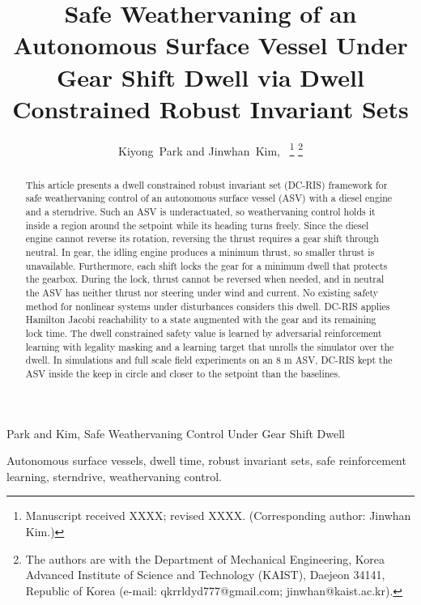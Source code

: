 \documentclass[lettersize,journal]{IEEEtran}
\newcommand{\dcris}{DC-RIS\xspace}
\begin{document}
\title{Safe Weathervaning of an Autonomous Surface Vessel Under Gear Shift Dwell via Dwell Constrained Robust Invariant Sets}

\author{Kiyong~Park and Jinwhan~Kim,~%
\thanks{Manuscript received XXXX; revised XXXX. (Corresponding author: Jinwhan Kim.)}%
\thanks{The authors are with the Department of Mechanical Engineering, Korea Advanced Institute of Science and Technology (KAIST), Daejeon 34141, Republic of Korea (e-mail: qkrrldyd777@gmail.com; jinwhan@kaist.ac.kr).}}

%
{Park and Kim, Safe Weathervaning Control Under Gear Shift Dwell}

\maketitle

\begin{abstract}
This article presents a dwell constrained robust invariant set (DC-RIS) framework for safe weathervaning control of an autonomous surface vessel (ASV) with a diesel engine and a sterndrive. Such an ASV is underactuated, so weathervaning control holds it inside a region around the setpoint while its heading turns freely. Since the diesel engine cannot reverse its rotation, reversing the thrust requires a gear shift through neutral. In gear, the idling engine produces a minimum thrust, so smaller thrust is unavailable. Furthermore, each shift locks the gear for a minimum dwell that protects the gearbox. During the lock, thrust cannot be reversed when needed, and in neutral the ASV has neither thrust nor steering under wind and current. No existing safety method for nonlinear systems under disturbances considers this dwell. \dcris applies Hamilton Jacobi reachability to a state augmented with the gear and its remaining lock time. The dwell constrained safety value is learned by adversarial reinforcement learning with legality masking and a learning target that unrolls the simulator over the dwell. In simulations and full scale field experiments on an 8 m ASV, \dcris kept the ASV inside the keep in circle and closer to the setpoint than the baselines.
\end{abstract}

\begin{IEEEkeywords}
Autonomous surface vessels, dwell time, robust invariant sets, safe reinforcement learning, sterndrive, weathervaning control.
\end{IEEEkeywords}
\end{document}
